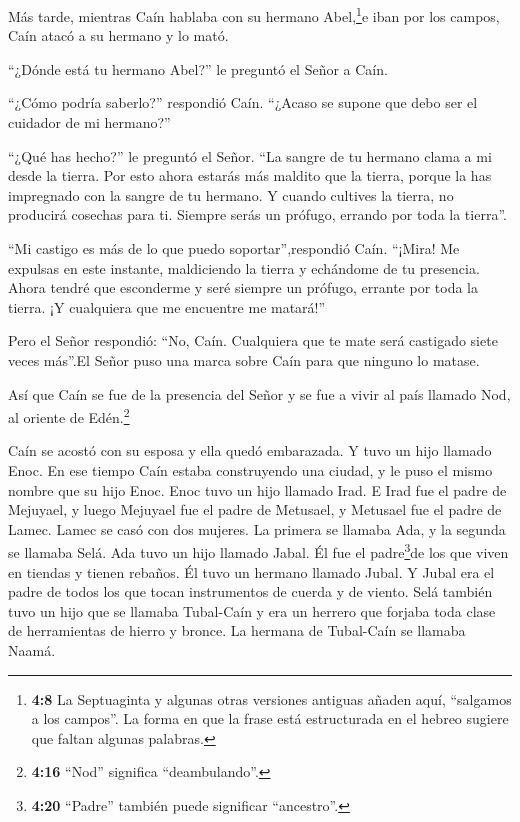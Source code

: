  Más tarde, mientras Caín hablaba con su hermano
Abel,\footnote{\textbf{4:8} La Septuaginta y algunas otras versiones
  antiguas añaden aquí, ``salgamos a los campos''. La forma en que la
  frase está estructurada en el hebreo sugiere que faltan algunas
  palabras.}e iban por los campos, Caín atacó a su hermano y lo mató.

 ``¿Dónde está tu hermano Abel?'' le preguntó el Señor a
Caín.

``¿Cómo podría saberlo?'' respondió Caín. ``¿Acaso se supone que debo
ser el cuidador de mi hermano?''

 ``¿Qué has hecho?'' le preguntó el Señor. ``La sangre de
tu hermano clama a mi desde la tierra.  Por esto ahora
estarás más maldito que la tierra, porque la has impregnado con la
sangre de tu hermano.  Y cuando cultives la tierra, no
producirá cosechas para ti. Siempre serás un prófugo, errando por toda
la tierra''.

 ``Mi castigo es más de lo que puedo soportar'',respondió
Caín.  ``¡Mira! Me expulsas en este instante, maldiciendo
la tierra y echándome de tu presencia. Ahora tendré que esconderme y
seré siempre un prófugo, errante por toda la tierra. ¡Y cualquiera que
me encuentre me matará!''

 Pero el Señor respondió: ``No, Caín. Cualquiera que te
mate será castigado siete veces más''.El Señor puso una marca sobre Caín
para que ninguno lo matase.

 Así que Caín se fue de la presencia del Señor y se fue a
vivir al país llamado Nod, al oriente de Edén.\footnote{\textbf{4:16}
  ``Nod'' significa ``deambulando''.}

 Caín se acostó con su esposa y ella quedó embarazada. Y
tuvo un hijo llamado Enoc. En ese tiempo Caín estaba construyendo una
ciudad, y le puso el mismo nombre que su hijo Enoc.  Enoc
tuvo un hijo llamado Irad. E Irad fue el padre de Mejuyael, y luego
Mejuyael fue el padre de Metusael, y Metusael fue el padre de Lamec.
 Lamec se casó con dos mujeres. La primera se llamaba Ada,
y la segunda se llamaba Selá.  Ada tuvo un hijo llamado
Jabal. Él fue el padre\footnote{\textbf{4:20} ``Padre'' también puede
  significar ``ancestro''.}de los que viven en tiendas y tienen rebaños.
 Él tuvo un hermano llamado Jubal. Y Jubal era el padre de
todos los que tocan instrumentos de cuerda y de viento. 
Selá también tuvo un hijo que se llamaba Tubal-Caín y era un herrero que
forjaba toda clase de herramientas de hierro y bronce. La hermana de
Tubal-Caín se llamaba Naamá.


